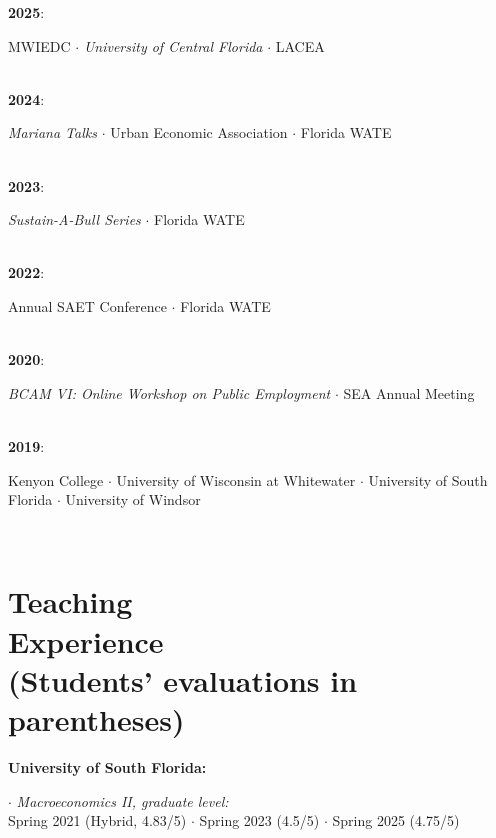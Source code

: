 \documentclass[mm, 10pt]{simple_style}
\begin{document}
\begin{resume}
\textbf{2025}: \begin{minipage}[t]{0.9\textwidth}
        {MWIEDC} 
        $\cdot$ {\color{gray} \textit{University of Central Florida}}
        $\cdot$ {\color{gray} LACEA}
        \end{minipage}\\
\textbf{2024}: \begin{minipage}[t]{0.9\textwidth}
        \emph{Mariana Talks}
        $\cdot$ {Urban Economic Association} 
        $\cdot$ {Florida WATE}
        \end{minipage}\\
\textbf{2023}: \begin{minipage}[t]{0.9\textwidth}
        \emph{Sustain-A-Bull Series}
        $\cdot$ Florida WATE
        \end{minipage}\\
\textbf{2022}: \begin{minipage}[t]{0.9\textwidth}
        Annual SAET Conference 
        $\cdot$ Florida WATE 
        \end{minipage}\\
\textbf{2020}: \begin{minipage}[t]{0.9\textwidth}
        \emph{BCAM VI: Online Workshop on Public Employment} 
        $\cdot$ SEA Annual Meeting
        \end{minipage}\\        
\textbf{2019}: \begin{minipage}[t]{0.9\textwidth}
        Kenyon College 
        $\cdot$ University of Wisconsin at Whitewater 
        $\cdot$ University of South Florida 
        $\cdot$ University of Windsor 
        \end{minipage}\\         


\clearpage
\section{Teaching\\ Experience \\ {\protect\footnotesize (Students' evaluations in parentheses)}}

\textbf{University of South Florida:}

$\cdot$ \textit{Macroeconomics II, graduate level:} \\
\indent \hspace{1cm} Spring 2021 (Hybrid, 4.83/5) $\cdot$ Spring 2023 (4.5/5) $\cdot$ Spring 2025 (4.75/5)


\end{resume}
\end{document}

